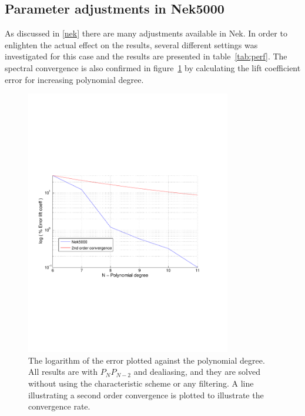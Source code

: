 \subsection{Parameter adjustments in Nek5000}
As discussed in \cref{nek} there are many adjustments available in Nek. 
In order to enlighten the actual effect on the results, several different settings was
investigated for this case and the results are presented in table~\ref{tab:perf}. 
The spectral convergence is also confirmed in figure~\ref{fig:liftconv} by calculating the 
lift coefficient error for increasing polynomial degree. 
%
\begin{figure}[h]
	\centerline{
        \includegraphics[trim=0.5cm 7cm 0.5cm 7cm, width=0.8\textwidth]{Figures/lift_coef2.pdf}}
	\caption{The logarithm of the error plotted against the polynomial degree. All results 
        are with $P_NP_{N-2}$ and dealiasing, and they are solved without using the 
    characteristic scheme or any filtering. A line illustrating a second order convergence is 
    plotted to illustrate the convergence rate.}
	\label{fig:liftconv}
\end{figure}
%

